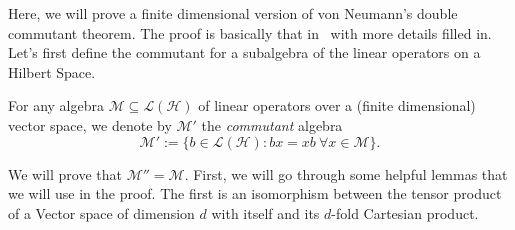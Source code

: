 
Here, we will prove a finite dimensional version of von Neumann's double commutant theorem. The proof is basically that in~\cite{jones15} with more details filled in. Let's first define the commutant for a subalgebra of the linear operators on a Hilbert Space.
\begin{definition}
\label{defn:commutant}
    For any algebra $\mathcal{M} \subseteq \mathcal{L}(\mathcal{H})$ of linear operators over a (finite dimensional) vector space, we denote by $\mathcal{M}'$ the \emph{commutant} algebra 
    \[ \mathcal{M}' := \{ b \in \mathcal{L}(\mathcal{H}) : bx = xb \: \forall x \in \mathcal{M}\}.\]
\end{definition}

We will prove that $\mathcal{M}'' = \mathcal{M}$. First, we will go through some helpful lemmas that we will use in the proof. The first is an isomorphism between the tensor product of a Vector space of dimension $d$ with itself and its $d$-fold Cartesian product.


